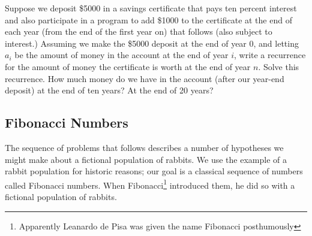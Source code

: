 \itemm Suppose we deposit \$5000 in a savings certificate that pays ten
percent interest and also participate in a program to add \$1000 to the
certificate at the end of each year (from the end of the first year on)
that follows (also subject to interest.)  Assuming we make the \$5000
deposit at the end of year 0, and letting $a_i$ be the amount of money in
the account at the end of year
$i$, write a recurrence for the amount of money the certificate is worth
at the end of year $n$.  Solve this recurrence.  How much money do we
have in the account (after our year-end deposit) at the end of ten years? 
At the end of 20 years?


\ep 

\subsection{Fibonacci Numbers}

The sequence of problems that follows describes a number of hypotheses we
might make about a fictional population of rabbits.  We use the example
of a rabbit population for historic reasons; our goal is a classical
sequence of numbers called Fibonacci numbers.  When
Fibonacci\footnote{Apparently Leanardo de Pisa was given the name Fibonacci
posthumously} introduced them, he did so with a fictional population of rabbits.

